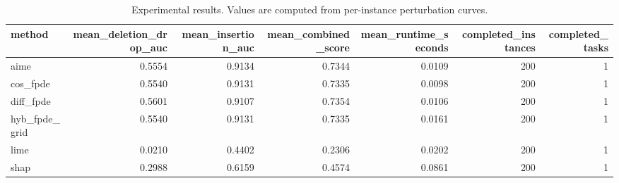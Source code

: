 \begin{table}[t]
\caption{Experimental results. Values are computed from per-instance perturbation curves.}
\label{tab:main_results_computed}
\centering
\begin{tabular}{lrrrrrr}
\toprule
method & mean\_deletion\_drop\_auc & mean\_insertion\_auc & mean\_combined\_score & mean\_runtime\_seconds & completed\_instances & completed\_tasks \\
\midrule
aime & 0.5554 & 0.9134 & 0.7344 & 0.0109 & 200 & 1 \\
cos\_fpde & 0.5540 & 0.9131 & 0.7335 & 0.0098 & 200 & 1 \\
diff\_fpde & 0.5601 & 0.9107 & 0.7354 & 0.0106 & 200 & 1 \\
hyb\_fpde\_grid & 0.5540 & 0.9131 & 0.7335 & 0.0161 & 200 & 1 \\
lime & 0.0210 & 0.4402 & 0.2306 & 0.0202 & 200 & 1 \\
shap & 0.2988 & 0.6159 & 0.4574 & 0.0861 & 200 & 1 \\
\bottomrule
\end{tabular}

\end{table}
